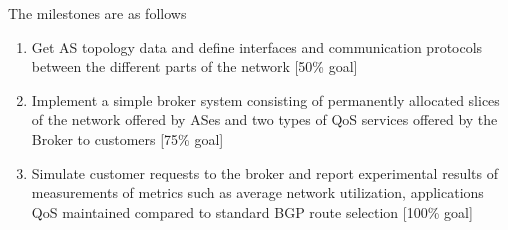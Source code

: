 The milestones are as follows
\begin{enumerate}
\item Get AS topology data and define interfaces and communication protocols between the different parts of the network [50\% goal]
\item Implement a simple broker system consisting of permanently allocated slices of the network offered by ASes and two types of QoS services offered by the Broker to customers [75\% goal]
\item Simulate customer requests to the broker and report experimental results of measurements of metrics such as average network utilization, applications QoS maintained compared to standard BGP route selection [100\% goal]
\end{enumerate}